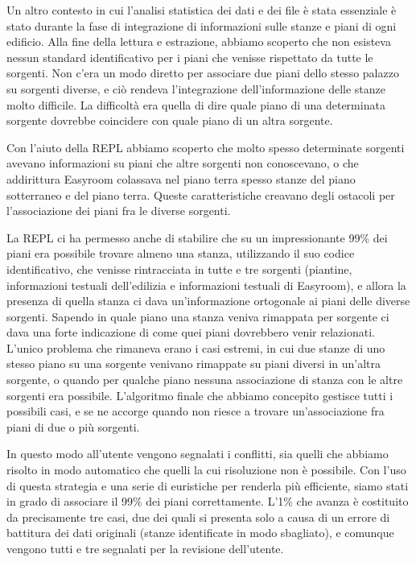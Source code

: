 \documentclass[12pt]{report}
\begin{document}
Un altro contesto in cui l'analisi statistica dei dati e dei file è stata essenziale è stato durante la fase di integrazione di informazioni sulle stanze e piani di ogni edificio. Alla fine della lettura e estrazione, abbiamo scoperto che non esisteva nessun standard identificativo per i piani che venisse rispettato da tutte le sorgenti. Non c'era un modo diretto per associare due piani dello stesso palazzo su sorgenti diverse, e ciò rendeva l'integrazione dell'informazione delle stanze molto difficile. La difficoltà era quella di dire quale piano di una determinata sorgente dovrebbe coincidere con quale piano di un altra sorgente. 

Con l'aiuto della REPL abbiamo scoperto che molto spesso determinate sorgenti avevano informazioni su piani che altre sorgenti non conoscevano, o che addirittura Easyroom colassava nel piano terra spesso stanze del piano sotterraneo e del piano terra. Queste caratteristiche creavano degli ostacoli per l'associazione dei piani fra le diverse sorgenti.

La REPL ci ha permesso anche di stabilire che su un impressionante 99\% dei piani era possibile trovare almeno una stanza, utilizzando il suo codice identificativo, che venisse rintracciata in tutte e tre sorgenti (piantine, informazioni testuali dell'edilizia e informazioni testuali di Easyroom), e allora la presenza di quella stanza ci dava un'informazione ortogonale ai piani delle diverse sorgenti. Sapendo in quale piano una stanza veniva rimappata per sorgente ci dava una forte indicazione di come quei piani dovrebbero venir relazionati. L'unico problema che rimaneva erano i casi estremi, in cui due stanze di uno stesso piano su una sorgente venivano rimappate su piani diversi in un'altra sorgente, o quando per qualche piano nessuna associazione di stanza con le altre sorgenti era possibile. L'algoritmo finale che abbiamo concepito gestisce tutti i possibili casi, e se ne accorge quando non riesce a trovare un'associazione fra piani di due o più sorgenti. 

In questo modo all'utente vengono segnalati i conflitti, sia quelli che abbiamo risolto in modo automatico che quelli la cui risoluzione non è possibile. Con l'uso di questa strategia e una serie di euristiche per renderla più efficiente, siamo stati in grado di associare il 99\% dei piani correttamente. L'1\% che avanza è costituito da precisamente tre casi, due dei quali si presenta solo a causa di un errore di battitura dei dati originali (stanze identificate in modo sbagliato), e comunque vengono tutti e tre segnalati per la revisione dell'utente. 
\end{document}

